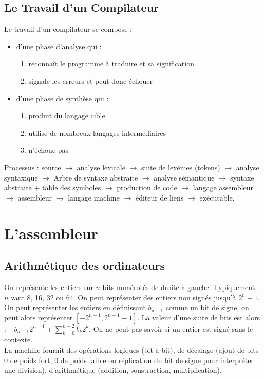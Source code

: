 \documentclass{cours}
\begin{document}
\subsection{Le Travail d'un Compilateur}
Le travail d'un compilateur se compose : 
\begin{itemize}
    \item d'une phase d'analyse qui : 
    \begin{enumerate}
        \item reconnaît le programme à traduire et sa signification
        \item signale les erreurs et peut donc échouer
    \end{enumerate}
    \item d'une phase de synthèse qui : 
    \begin{enumerate}
        \item produit du langage cible 
        \item utilise de nombreux langages intermédiaires
        \item n'échoue pas
    \end{enumerate}
\end{itemize}
Processus : source $\rightarrow$ analyse lexicale $\rightarrow$ suite de lexèmes (tokens) $\rightarrow$ analyse syntaxique $\rightarrow$ Arbre de syntaxe abstraite $\rightarrow$ analyse sémantique $\rightarrow$ syntaxe abstraite + table des symboles $\rightarrow$ production de code $\rightarrow$ langage assembleur $\rightarrow$ assembleur $\rightarrow$ langage machine $\rightarrow$ éditeur de liens $\rightarrow$ exécutable.

\section{L'assembleur}
\subsection{Arithmétique des ordinateurs}
On représente les entiers sur $n$ bits numérotés de droite à gauche. Typiquement, $n$ vaut 8, 16, 32 ou 64. On peut représenter des entiers non signés jusqu'à $2^{n} - 1$. On peut représenter les entiers en définissant $b_{n-1}$ comme un bit de signe, on peut alors représenter $\left[-2^{n-1}, 2^{n-1}-1\right]$. La valeur d'une suite de bits est alors : $-b_{n-1}2^{n-1} + \sum_{k = 0}^{n-2} b_{k} 2^{k}$. On ne peut pas savoir si un entier est signé sans le contexte. \\
La machine fournit des opérations logiques (bit à bit), de décalage (ajout de bits 0 de poids fort, 0 de poids faible ou réplication du bit de signe pour interpréter une division), d'arithmétique (addition, soustraction, multiplication). \\
\end{document}
